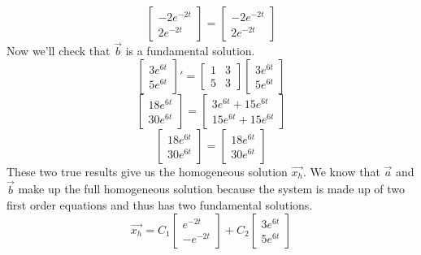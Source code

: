 \begin{equation*}
	\begin{bmatrix}
	-2e^{-2t} \\
	2e^{-2t}
	\end{bmatrix} = \begin{bmatrix}
		-2e^{-2t} \\
		2e^{-2t}
	\end{bmatrix}
\end{equation*}
Now we'll check that $\vec{b}$ is a fundamental solution.
\begin{equation*}
	\begin{bmatrix}
		3e^{6t} \\
		5e^{6t}
	\end{bmatrix}' = \begin{bmatrix}
		1 & 3 \\
		5 & 3
	\end{bmatrix} \begin{bmatrix}
		3e^{6t} \\
		5e^{6t}
	\end{bmatrix}
\end{equation*}
\begin{equation*}
	\begin{bmatrix}
		18e^{6t} \\
		30e^{6t}
	\end{bmatrix} = \begin{bmatrix}
		3e^{6t} + 15e^{6t} \\
		15e^{6t} + 15e^{6t}
	\end{bmatrix}
\end{equation*}
\begin{equation*}
	\begin{bmatrix}
		18e^{6t} \\
		30e^{6t}
	\end{bmatrix} = \begin{bmatrix}
		18e^{6t} \\
		30e^{6t}
	\end{bmatrix}
\end{equation*}
These two true results give us the homogeneous solution $\vec{x_h}$.
We know that $\vec{a}$ and $\vec{b}$ make up the full homogeneous solution because the system is made up of two first order equations and thus has two fundamental solutions.
\begin{equation*}
	\vec{x_h} = C_1\begin{bmatrix}
		e^{-2t} \\
		-e^{-2t}
	\end{bmatrix} + C_2\begin{bmatrix}
		3e^{6t} \\
		5e^{6t}
	\end{bmatrix}
\end{equation*}

